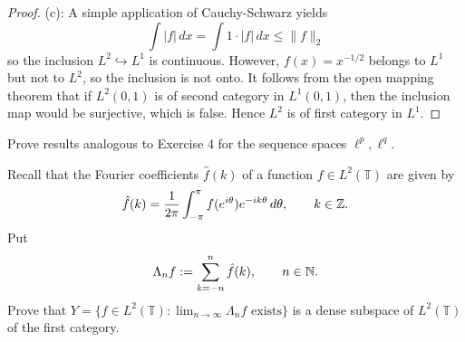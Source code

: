 \begin{proof}
	(c): A simple application of Cauchy-Schwarz yields
	\begin{equation*}
		\int |f| \,dx = \int 1 \cdot |f| \,dx \le \|f\|_2
	\end{equation*}
	so the inclusion $L^2 \hookrightarrow L^1$ is continuous. However, $f(x) = x^{-1/2}$ belongs to $L^1$ but not to $L^2$, so the inclusion is not onto. It follows from the open mapping theorem that if $L^2(0,1)$ is of second category in $L^1(0,1)$, then the inclusion map would be surjective, which is false. Hence $L^2$ is of first category in $L^1$.
\end{proof}

\begin{exercise}[Ex.\ 2.5]
	Prove results analogous to Exercise 4 for the sequence spaces $\ell^p, \ell^q$.
\end{exercise}

\begin{exercise}[Ex.\ 2.6]
	Recall that the Fourier coefficients $\hat{f}(k)$ of a function $f \in L^2(\mathbb{T})$ are given by
	\begin{equation*}
		\hat{f}(k) = \frac{1}{2\pi}\int_{-\pi}^\pi f(e^{i\theta}) e^{-ik\theta} \,d\theta, \qquad k \in \mathbb{Z}.
	\end{equation*}
	Put
	\begin{equation*}
		\Lambda_n f := \sum_{k=-n}^n \hat{f}(k), \qquad n \in \mathbb{N}.
	\end{equation*}
	Prove that $Y = \{f \in L^2(\mathbb{T}) : \lim_{n\to\infty} \Lambda_n f \text{ exists}\}$ is a dense subspace of $L^2(\mathbb{T})$ of the first category.
\end{exercise}

